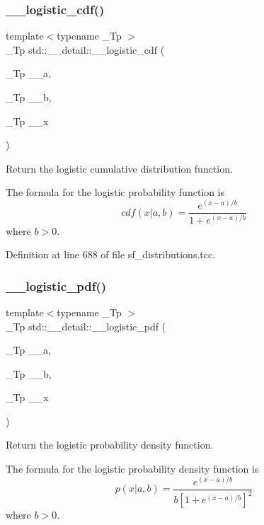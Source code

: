 \subsubsection{\texorpdfstring{\+\_\+\+\_\+logistic\+\_\+cdf()}{\_\_logistic\_cdf()}}
{\footnotesize\ttfamily template$<$typename \+\_\+\+Tp $>$ \\
\+\_\+\+Tp std\+::\+\_\+\+\_\+detail\+::\+\_\+\+\_\+logistic\+\_\+cdf (\begin{DoxyParamCaption}\item[{\+\_\+\+Tp}]{\+\_\+\+\_\+a,  }\item[{\+\_\+\+Tp}]{\+\_\+\+\_\+b,  }\item[{\+\_\+\+Tp}]{\+\_\+\+\_\+x }\end{DoxyParamCaption})}



Return the logistic cumulative distribution function. 

The formula for the logistic probability function is \[ cdf(x| a, b) = \frac{e^{(x - a)/b}}{1 + e^{(x - a)/b}} \] where $b > 0$. 

Definition at line 688 of file sf\+\_\+distributions.\+tcc.

\mbox{\label{namespacestd_1_1____detail_a4c845b9f17fc3e35dccc0954d82d62f9}} 
\subsubsection{\texorpdfstring{\+\_\+\+\_\+logistic\+\_\+pdf()}{\_\_logistic\_pdf()}}
{\footnotesize\ttfamily template$<$typename \+\_\+\+Tp $>$ \\
\+\_\+\+Tp std\+::\+\_\+\+\_\+detail\+::\+\_\+\+\_\+logistic\+\_\+pdf (\begin{DoxyParamCaption}\item[{\+\_\+\+Tp}]{\+\_\+\+\_\+a,  }\item[{\+\_\+\+Tp}]{\+\_\+\+\_\+b,  }\item[{\+\_\+\+Tp}]{\+\_\+\+\_\+x }\end{DoxyParamCaption})}



Return the logistic probability density function. 

The formula for the logistic probability density function is \[ p(x| a, b) = \frac{e^{(x - a)/b}}{b[1 + e^{(x - a)/b}]^2} \] where $b > 0$. 

